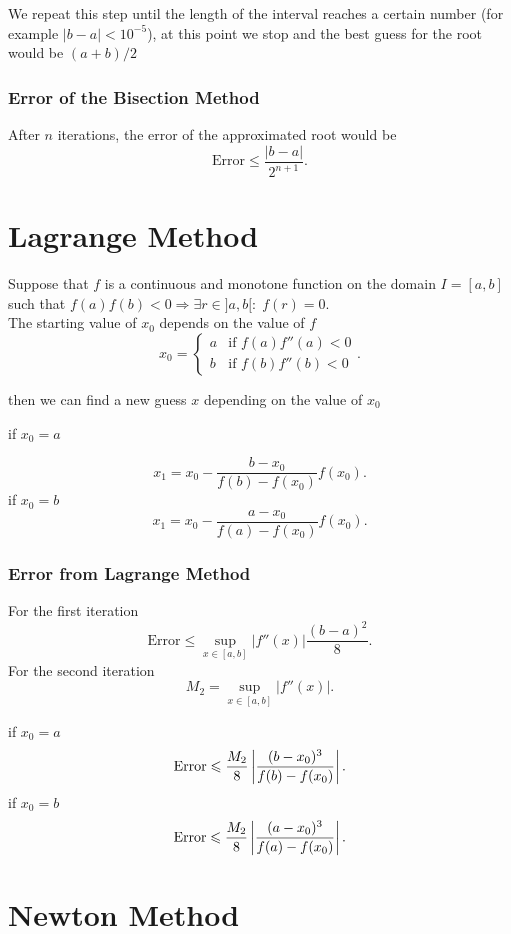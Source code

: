 \documentclass{report}
\begin{document}
We repeat this step until the length of the interval reaches a certain number (for example $|b-a|<10^{-5}$), at this point we stop and the best guess for the root would be $(a+b)/2$

\subsubsection{Error of the Bisection Method}

After $n$ iterations, the error of the approximated root would be
\[
	\text{Error} \leq \frac{|b-a|}{2^{n+1}}
	.\]

\section{Lagrange Method}

Suppose that $f$ is a continuous and monotone function on the domain $I = [a,b]$ such that $f(a)f(b)<0\Rightarrow \exists r \in]a,b[:\;f(r)=0$.\\

The starting value of $x_0$ depends on the value of $f$
\[
	x_0 = \begin{cases}
		a & \text{if }f(a)f''(a)<0 \\
		b & \text{if }f(b)f''(b)<0
	\end{cases}
	.\]

then we can find a new guess $x$ depending on the value of $x_0$
\begin{itemize}
	\ii if $x_0 = a$

	\[
		x_1 = x_0 - \frac{b-x_0}{f(b)-f(x_0)}f(x_0)
		.\]
	\ii if $x_0 = b$
	\[
		x_1 = x_0-\frac{a-x_0}{f(a)-f(x_0)}f(x_0)
		.\]
\end{itemize}

\subsubsection{Error from Lagrange Method}
For the first iteration
\[
	\text{Error} \leq \sup_{x\in[a,b]}|f''(x)|\frac{(b-a)^2}{8}
	.\]
For the second iteration
\[
	M_2 = \sup_{x\in[a,b]}|f''(x)|
	.\]
\begin{itemize}
	\ii if $x_0 = a$
	\[
		\text{Error} \leqslant \frac{M_2}{8}\left|\frac{(b-x_0)^3}{f(b)-f(x_0)}\right|
		.\]
	\ii if $x_0 = b$
	\[
		\text{Error} \leqslant \frac{M_2}{8}\left|\frac{(a-x_0)^3}{f(a)-f(x_0)}\right|
		.\]
\end{itemize}

\section{Newton Method}
\end{document}
